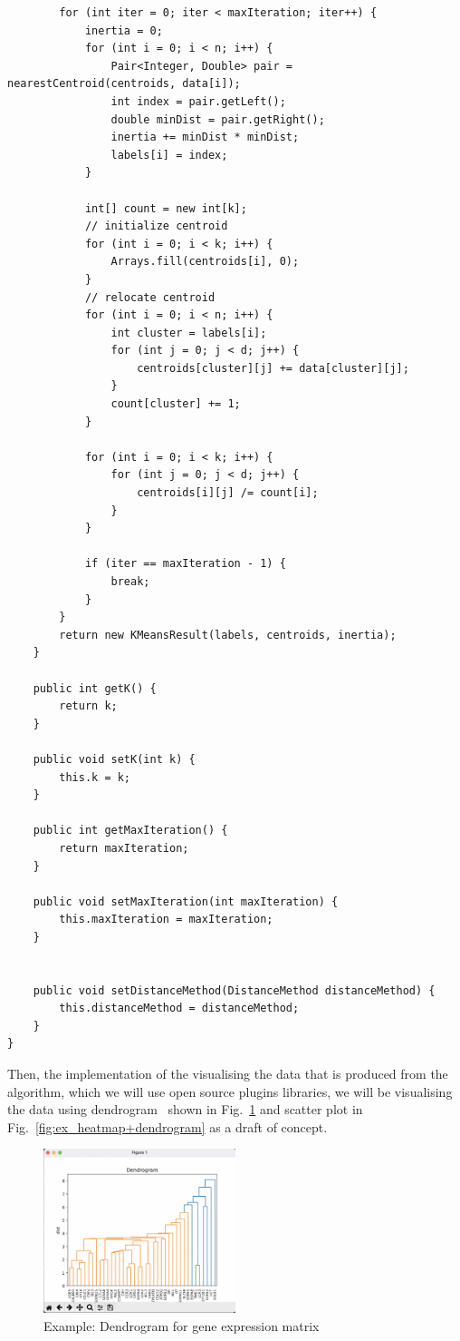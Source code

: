 \documentclass[]{final_report}
\begin{document}
\begin{verbatim}
        for (int iter = 0; iter < maxIteration; iter++) {
            inertia = 0;
            for (int i = 0; i < n; i++) {
                Pair<Integer, Double> pair = nearestCentroid(centroids, data[i]);
                int index = pair.getLeft();
                double minDist = pair.getRight();
                inertia += minDist * minDist;
                labels[i] = index;
            }

            int[] count = new int[k];
            // initialize centroid
            for (int i = 0; i < k; i++) {
                Arrays.fill(centroids[i], 0);
            }
            // relocate centroid
            for (int i = 0; i < n; i++) {
                int cluster = labels[i];
                for (int j = 0; j < d; j++) {
                    centroids[cluster][j] += data[cluster][j];
                }
                count[cluster] += 1;
            }

            for (int i = 0; i < k; i++) {
                for (int j = 0; j < d; j++) {
                    centroids[i][j] /= count[i];
                }
            }

            if (iter == maxIteration - 1) {
                break;
            }
        }
        return new KMeansResult(labels, centroids, inertia);
    }

    public int getK() {
        return k;
    }

    public void setK(int k) {
        this.k = k;
    }

    public int getMaxIteration() {
        return maxIteration;
    }

    public void setMaxIteration(int maxIteration) {
        this.maxIteration = maxIteration;
    }


    public void setDistanceMethod(DistanceMethod distanceMethod) {
        this.distanceMethod = distanceMethod;
    }
}
\end{verbatim}

Then, the implementation of the visualising the data that is produced from the algorithm, which we will use open source plugins libraries, we will be visualising the data using dendrogram~\cite{Macdonald2011Analysis} shown in Fig.~\ref{fig:ex_dendrogram} and scatter plot in Fig.~\ref{fig:ex_heatmap+dendrogram} as a draft of concept.

\begin{figure}[H]
\centering
     \includegraphics[width=0.5\textwidth]{Rplot02.png}
      \caption{Example: Dendrogram for gene expression matrix }
       \label{fig:ex_dendrogram}
\end{figure}
\end{document}
